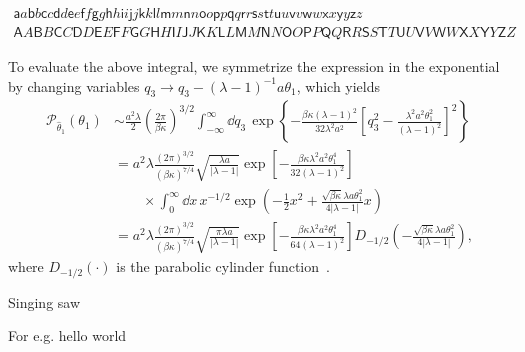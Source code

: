 \begin{gather*}
\mathsf{a}a
\mathsf{b}b
\mathsf{c}c
\mathsf{d}d
\mathsf{e}e
\mathsf{f}f
\mathsf{g}g
\mathsf{h}h
\mathsf{i}i
\mathsf{j}j
\mathsf{k}k
\mathsf{l}l
\mathsf{m}m
\mathsf{n}n
\mathsf{o}o
\mathsf{p}p
\mathsf{q}q
\mathsf{r}r
\mathsf{s}s
\mathsf{t}t
\mathsf{u}u
\mathsf{v}v
\mathsf{w}w
\mathsf{x}x
\mathsf{y}y
\mathsf{z}z\\
\mathsf{A}A
\mathsf{B}B
\mathsf{C}C
\mathsf{D}D
\mathsf{E}E
\mathsf{F}F
\mathsf{G}G
\mathsf{H}H
\mathsf{I}I
\mathsf{J}J
\mathsf{K}K
\mathsf{L}L
\mathsf{M}M
\mathsf{N}N
\mathsf{O}O
\mathsf{P}P
\mathsf{Q}Q
\mathsf{R}R
\mathsf{S}S
\mathsf{T}T
\mathsf{U}U
\mathsf{V}V
\mathsf{W}W
\mathsf{X}X
\mathsf{Y}Y
\mathsf{Z}Z
\end{gather*}

To evaluate the above integral, we symmetrize the expression in the exponential by changing variables $q_3 \to q_3 - (\lambda-1)^{-1}a\theta_1$, which yields
\begin{equation}
  \begin{aligned}
    \mathcal{P}_{\hat{\theta}_1}(\theta_1) &\sim \frac{a^2\lambda}{2}\left(\frac{2\pi}{\beta\kappa}\right)^{3/2}\!\int_{-\infty}^{\infty} \dd q_3\, \exp\left\{-\frac{\beta\kappa(\lambda-1)^2}{32\lambda^2 a^2}\left[q_3^2 - \frac{\lambda^2 a^2\theta_1^2}{(\lambda-1)^2}\right]^2\right\}\\
                                           &= a^2\lambda\frac{(2\pi)^{3/2}}{(\beta\kappa)^{7/4}}\sqrt{\frac{\lambda{a}}{|\lambda-1|}}\exp\left[-\frac{\beta\kappa\lambda^2a^2\theta_1^4}{32(\lambda-1)^2}\right]\\
                                           &{} \qquad\times\int_{0}^{\infty} \dd x\, x^{-1/2}\exp\left(-\frac{1}{2}x^2 + \frac{\sqrt{\beta\kappa}\lambda a\theta_1^2}{4|\lambda-1|}x\right)\\
                                           &= a^2\lambda\frac{(2\pi)^{3/2}}{(\beta\kappa)^{7/4}}\sqrt{\frac{\pi\lambda{a}}{|\lambda-1|}}\exp\left[-\frac{\beta\kappa\lambda^2a^2\theta_1^4}{64(\lambda-1)^2}\right]D_{-1/2}\left(-\frac{\sqrt{\beta\kappa}\lambda a\theta_1^2}{4|\lambda-1|}\right),
  \end{aligned}
\end{equation}
where $D_{-1/2}(\cdot)$ is the parabolic cylinder function~\cite{olver2010}.

Singing saw~\cite{stuckenbruck2016}


For e.g. hello world
